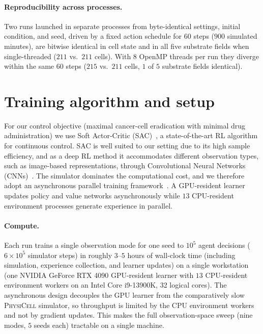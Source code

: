 \documentclass{article}
\newcommand{\physicell}{\textsc{PhysiCell}}
\begin{document}
\paragraph{Reproducibility across processes.}
Two runs launched in separate processes from byte-identical settings, initial
condition, and seed, driven by a fixed action schedule for $60$ steps ($900$
simulated minutes), are bitwise identical in cell state and in all five
substrate fields when single-threaded ($211$ vs.\ $211$ cells). With $8$
OpenMP threads per run they diverge within the same $60$ steps ($215$ vs.\
$211$ cells, $1$ of $5$ substrate fields identical).

\section{Training algorithm and setup}
\label{sec:training}

For our control objective (maximal cancer-cell eradication with minimal drug
administration) we use Soft Actor-Critic
(SAC)~\citep{haarnoja2018soft}, a state-of-the-art RL algorithm for continuous
control. SAC is well suited to our setting due to its high sample efficiency,
and as a deep RL method it accommodates different observation types, such as
image-based representations, through Convolutional Neural Networks
(CNNs)~\citep{o2015introduction}. The simulator dominates the computational
cost, and we therefore adopt an asynchronous parallel
training framework~\citep{mnih2016asynchronous, liu2025asynchronous}.
A GPU-resident learner updates policy and value networks asynchronously while
$13$ CPU-resident environment processes generate experience in parallel.

\paragraph{Compute.}
Each run trains a single observation mode for one seed to $10^5$ agent decisions
($6\!\times\!10^5$ simulator steps) in roughly $3$--$5$ hours of wall-clock time
(including simulation, experience collection, and learner updates)
on a single workstation (one NVIDIA GeForce RTX 4090 GPU-resident learner with
$13$ CPU-resident environment workers on an Intel Core i9-13900K, 32 logical
cores). The asynchronous design decouples the GPU learner from the
comparatively slow \physicell{} simulator, so throughput is limited by the CPU
environment workers and not by gradient updates. This makes the full
observation-space sweep (nine modes, $5$ seeds each) tractable on a single
machine.
\end{document}
